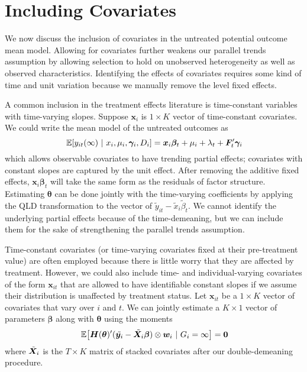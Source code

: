 \section{Including Covariates}


We now discuss the inclusion of covariates in the untreated potential outcome mean model. Allowing for covariates further weakens our parallel trends assumption by allowing selection to hold on unobserved heterogeneity as well as observed characteristics. Identifying the effects of covariates requires some kind of time and unit variation because we manually remove the level fixed effects. 

A common inclusion in the treatment effects literature is time-constant variables with time-varying slopes. Suppose $\bm x_i$ is $1 \times K$ vector of time-constant covariates. We could write the mean model of the untreated outcomes as 
\begin{equation}
    \expec{y_{it}(\infty)}{x_i, \mu_i, \bm \gamma_i, D_i} = \bm x_i \bm \beta_t + \mu_i + \lambda_t + \bm{F}_t' \bm \gamma_i
\end{equation}
which allows observable covariates to have trending partial effects; covariates with constant slopes are captured by the unit effect. After removing the additive fixed effects, $\bm x_i \bm \beta_t$ will take the same form as the residuals of factor structure. Estimating $\bm{\theta}$ can be done jointly with the time-varying coefficients by applying the QLD transformation to the vector of $\tilde{y}_{it} - \tilde{x}_i \tilde{\beta}_t$. We cannot identify the underlying partial effects because of the time-demeaning, but we can include them for the sake of strengthening the parallel trends assumption.

Time-constant covariates (or time-varying covariates fixed at their pre-treatment value) are often employed because there is little worry that they are affected by treatment. However, we could also include time- and individual-varying covariates of the form $\bm x_{it}$ that are allowed to have identifiable constant slopes if we assume their distribution is unaffected by treatment status. Let $\bm x_{it}$ be a $1 \times K$ vector of covariates that vary over $i$ and $t$. We can jointly estimate a $K \times 1$ vector of parameters $\bm \beta$ along with $\bm{\theta}$ using the moments
\begin{equation}
    \expec{\bm H(\bm{\theta})' (\tilde{\bm y_i} - \tilde{\bm X_i} \bm \beta) \otimes \bm w_i}{G_i = \infty} = \bm 0
\end{equation}
where $\Tilde{\bm X}_i$ is the $T \times K$ matrix of stacked covariates after our double-demeaning procedure.

